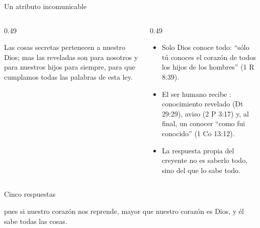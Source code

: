 \begin{frame}{Un atributo incomunicable}
\begin{columns}[t,onlytextwidth]
\begin{column}{0.49\textwidth}
\begin{cita}Las cosas secretas pertenecen a \SENOR{} nuestro Dios; mas las reveladas son para nosotros y para nuestros hijos para siempre, para que cumplamos todas las palabras de esta ley.\end{cita}
\end{column}
\begin{column}{0.49\textwidth}\small
\begin{itemize}
\item Solo Dios conoce todo: ``sólo tú conoces el corazón de todos los hijos de los hombres'' (1 R 8:39).
\item El ser humano recibe : conocimiento revelado (Dt 29:29), aviso (2 P 3:17) y, al final, un conocer ``como fui conocido'' (1 Co 13:12).
\item La respuesta propia del creyente no es saberlo todo, sino  del que lo sabe todo.
\end{itemize}
\end{column}
\end{columns}
\end{frame}

\begin{frame}{Cinco respuestas}
\centering
{}\par\medskip
\begin{cita}pues si nuestro corazón nos reprende, mayor que nuestro corazón es Dios, y él sabe todas las cosas.\end{cita}
\end{frame}

